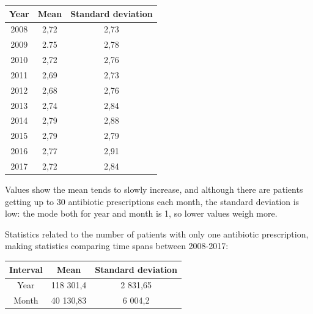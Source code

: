 \begin{center}
	\begin{tabular}{|c|c|c|}
		\hline
		Year & Mean & Standard deviation \\
		\hline
		2008 & 2,72 & 2,73 \\
		\hline
		2009 & 2.75 & 2,78 \\
		\hline
		2010 & 2,72 &  2,76 \\
		\hline
		2011 & 2,69 &  2,73 \\
		\hline
		2012 & 2,68 & 2,76 \\
		\hline
		2013 & 2,74 & 2,84 \\
		\hline
		2014 & 2,79 & 2,88 \\
		\hline
		2015 & 2,79 & 2,79 \\
		\hline
		2016 & 2,77 & 2,91 \\
		\hline
		2017 & 2,72 & 2,84 \\
		\hline
	\end{tabular}
\end{center}

Values show the mean tends to slowly increase, and although there are patients getting up to 30 antibiotic prescriptions each month, the standard deviation is low: the mode both for year and month is 1, so lower values weigh more.

Statistics related to the number of patients with only one antibiotic prescription, making statistics comparing time spans between 2008-2017:
\begin{center}
	\begin{tabular}{|c|c|c|}
		\hline
		Interval & Mean & Standard deviation \\
		\hline
		Year & 118 301,4 & 2 831,65 \\
		\hline
		Month & 40 130,83 & 6 004,2 \\
		\hline
	\end{tabular}
\end{center}

